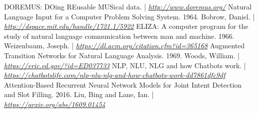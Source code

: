 \documentclass[a4paper,12pt]{report}
\begin{document}
	\begin{thebibliography}{9}
		 DOREMUS: DOing REusable MUSical data. | \textit{\href{http://www.doremus.org/}{http://www.doremus.org/}}
		 Natural Language Input for a Computer Problem Solving System. 1964. Bobrow, Daniel. | \textit{\href{http://dspace.mit.edu/handle/1721.1/5922}{http://dspace.mit.edu/handle/1721.1/5922}}
		 ELIZA: A computer program for the study of natural language communication between man and machine. 1966. Weizenbaum, Joseph. | \textit{\href{https://dl.acm.org/citation.cfm?id=365168}{https://dl.acm.org/citation.cfm?id=365168}}
		 Augmented Transition Networks for Natural Language Analysis. 1969. Woods, William. | \textit{\href{https://eric.ed.gov/?id=ED037733}{https://eric.ed.gov/?id=ED037733}}
		 NLP, NLU, NLG and how Chatbots work. | \textit{\href{https://chatbotslife.com/nlp-nlu-nlg-and-how-chatbots-work-dd7861dfc9df}{https://chatbotslife.com/nlp-nlu-nlg-and-how-chatbots-work-dd7861dfc9df}}
		 Attention-Based Recurrent Neural Network Models for Joint Intent Detection and Slot Filling. 2016. Liu, Bing and Lane, Ian. | \textit{\href{https://arxiv.org/abs/1609.01454}{https://arxiv.org/abs/1609.01454}}
	\end{thebibliography}
\end{document}
